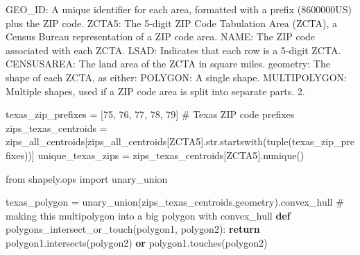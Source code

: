 \documentclass[
  letterpaper,
  DIV=11,
  numbers=noendperiod]{scrartcl}
\newenvironment{Shaded}{\begin{snugshade}}{\end{snugshade}}
\newcommand{\BuiltInTok}[1]{\textcolor[rgb]{0.00,0.23,0.31}{#1}}
\newcommand{\CommentTok}[1]{\textcolor[rgb]{0.37,0.37,0.37}{#1}}
\newcommand{\ControlFlowTok}[1]{\textcolor[rgb]{0.00,0.23,0.31}{\textbf{#1}}}
\newcommand{\ImportTok}[1]{\textcolor[rgb]{0.00,0.46,0.62}{#1}}
\newcommand{\KeywordTok}[1]{\textcolor[rgb]{0.00,0.23,0.31}{\textbf{#1}}}
\newcommand{\NormalTok}[1]{\textcolor[rgb]{0.00,0.23,0.31}{#1}}
\newcommand{\OperatorTok}[1]{\textcolor[rgb]{0.37,0.37,0.37}{#1}}
\newcommand{\StringTok}[1]{\textcolor[rgb]{0.13,0.47,0.30}{#1}}
\begin{document}
GEO\_ID: A unique identifier for each area, formatted with a prefix
(8600000US) plus the ZIP code. ZCTA5: The 5-digit ZIP Code Tabulation
Area (ZCTA), a Census Bureau representation of a ZIP code area. NAME:
The ZIP code associated with each ZCTA. LSAD: Indicates that each row is
a 5-digit ZCTA. CENSUSAREA: The land area of the ZCTA in square miles.
geometry: The shape of each ZCTA, as either: POLYGON: A single shape.
MULTIPOLYGON: Multiple shapes, used if a ZIP code area is split into
separate parts. 2.

\begin{Shaded}
\begin{Highlighting}[]
\NormalTok{texas\_zip\_prefixes }\OperatorTok{=}\NormalTok{ [}\StringTok{\textquotesingle{}75\textquotesingle{}}\NormalTok{, }\StringTok{\textquotesingle{}76\textquotesingle{}}\NormalTok{, }\StringTok{\textquotesingle{}77\textquotesingle{}}\NormalTok{, }\StringTok{\textquotesingle{}78\textquotesingle{}}\NormalTok{, }\StringTok{\textquotesingle{}79\textquotesingle{}}\NormalTok{]  }\CommentTok{\# Texas ZIP code prefixes}
\NormalTok{zips\_texas\_centroids }\OperatorTok{=}\NormalTok{ zips\_all\_centroids[zips\_all\_centroids[}\StringTok{\textquotesingle{}ZCTA5\textquotesingle{}}\NormalTok{].}\BuiltInTok{str}\NormalTok{.startswith(}\BuiltInTok{tuple}\NormalTok{(texas\_zip\_prefixes))]}
\NormalTok{unique\_texas\_zips }\OperatorTok{=}\NormalTok{ zips\_texas\_centroids[}\StringTok{\textquotesingle{}ZCTA5\textquotesingle{}}\NormalTok{].nunique()}
\end{Highlighting}
\end{Shaded}

\begin{Shaded}
\begin{Highlighting}[]
\ImportTok{from}\NormalTok{ shapely.ops }\ImportTok{import}\NormalTok{ unary\_union}

\NormalTok{texas\_polygon }\OperatorTok{=}\NormalTok{ unary\_union(zips\_texas\_centroids.geometry).convex\_hull}
\CommentTok{\# making this multipolygon into a big polygon with convex\_hull}
\KeywordTok{def}\NormalTok{ polygons\_intersect\_or\_touch(polygon1, polygon2):}
    \ControlFlowTok{return}\NormalTok{ polygon1.intersects(polygon2) }\KeywordTok{or}\NormalTok{ polygon1.touches(polygon2)}
\end{Highlighting}
\end{Shaded}
\end{document}
